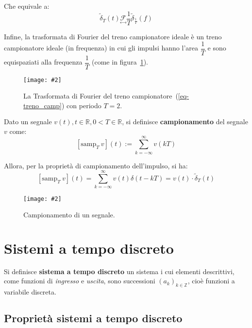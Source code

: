 \documentclass[a4paper]{article}
\newcommand{\F}{\mathcal{F}}
\newcommand{\customimg}[2]{\texttt{[image: \#2]}}
\begin{document}
	Che equivale a:
	\begin{equation*}
		\tilde{\delta}_T(t) \underset{\longleftrightarrow}{\F} \dfrac{1}{T} \tilde{\delta}_{\frac{1}{T}}(f)
	\end{equation*}

	Infine, la trasformata di Fourier del treno campionatore ideale è un treno campionatore ideale (in frequenza) in cui gli impulsi hanno l’area $\dfrac{1}{T}$ e sono equispaziati alla frequenza $\dfrac{1}{T}$ (come in figura~\ref*{img-tdf_treno_camp}).
	
	\begin{figure}[!htp]
		\centering
		\customimg{0.5}{img/tdf-treno-campionatore.pdf}
		\caption{La Trasformata di Fourier del treno campionatore~(\ref{eq-treno_camp}) con periodo $T=2$.}
		\label{img-tdf_treno_camp}
	\end{figure}
	
	Dato un segnale $v(t), t\in\mathbb{R}, 0<T\in\mathbb{R}$, si definisce \textbf{campionamento} del segnale $v$ come:	
	\begin{equation}\label{eq-camp}
		[\mathrm{samp}_T\:v](t) := \sum_{k=-\infty}^{\infty} v(kT)
	\end{equation}
	
	Allora, per la proprietà di campionamento dell’impulso, si ha:
	\begin{equation}\label{eq-camp_imp}
		[\mathrm{samp}_T\:v](t) = \sum_{k=-\infty}^{\infty} v(t)\delta(t-kT) = v(t)\cdot\tilde{\delta}_T(t)
	\end{equation}
	
	\begin{figure}[!htp]
		\centering
		\customimg{0.7}{img/camp-impulso.pdf}
		\caption{Campionamento di un segnale.}
		\label{img-camp}
	\end{figure}
	
	\section{Sistemi a tempo discreto}\label{sec-sis_tmp_disc}
	
	Si definisce \textbf{sistema a tempo discreto} un sistema i cui elementi descrittivi, come funzioni di \emph{ingresso} e \emph{uscita}, sono successioni $(a_{k})_{k\in\mathbb{Z}}$, cioè funzioni a variabile discreta.
	
	\subsection{Proprietà sistemi a tempo discreto}
	
\end{document}

